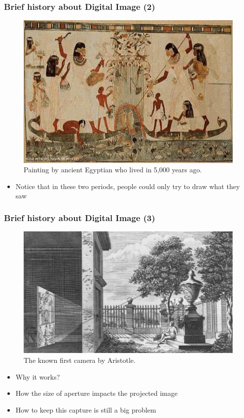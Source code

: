 \begin{frame}
 \frametitle{Brief history about Digital Image (2)}
 \vspace{-0.1in}
 \begin{figure}
\begin{center}
	\includegraphics[width=0.66\linewidth]{./figs/egypt_paint.pdf}
\end{center}
\caption{Painting by ancient Egyptian who lived in 5,000 years ago.}
\end{figure}
 \begin{itemize}
 	\item {Notice that in these two periods, people could only try to draw what they saw}
 \end{itemize}
\end{frame}

\begin{frame}
 \frametitle{Brief history about Digital Image (3)}
 \begin{figure}
\begin{center}
	\includegraphics[width=0.66\linewidth]{./figs/camera_obscura.pdf}
\end{center}
\caption{The known first camera by Aristotle.}
\end{figure}
 \begin{itemize}
 	\item {Why it works?}
 	\item {How the size of aperture impacts the projected image}
 	\item {How to keep this capture is still a big problem}
 \end{itemize}
\end{frame}


